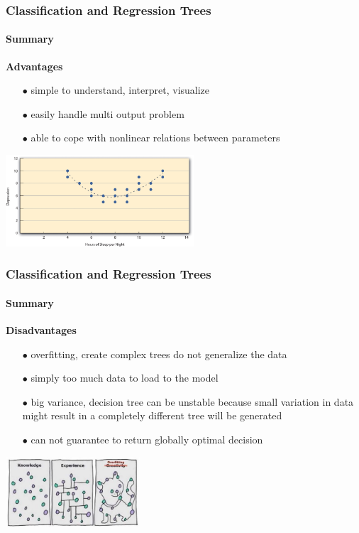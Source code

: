 \begin{frame}
	\frametitle{Classification and Regression Trees}
		\framesubtitle{Summary}

		
		\textbf{Advantages}
		\begin{center}
		\begin{itemize}
		  \item[$\bullet$] simple to understand, interpret, visualize
		  \item[$\bullet$] easily handle multi output problem
		  \item[$\bullet$] able to cope with nonlinear relations between parameters
		\end{itemize}
		
		\vfill
		
		\includegraphics[width=7cm]{./figures/pros}
		\end{center}
		
\end{frame}

\begin{frame}
	\frametitle{Classification and Regression Trees}
		\framesubtitle{Summary}

		
		\textbf{Disadvantages}
		\begin{center}
		\begin{itemize}
		   \item[$\bullet$] overfitting, create complex trees do not generalize the data
		   \item[$\bullet$] simply too much data to load to the model 
		   \item[$\bullet$] big variance, decision tree can be unstable because small variation in data might result  in a completely different tree will be generated
		   \item[$\bullet$] can not guarantee to return globally optimal decision
		\end{itemize}
		
		\vfill
		
		\includegraphics[width=5cm]{./figures/cons}
		\end{center}
		
\end{frame}

